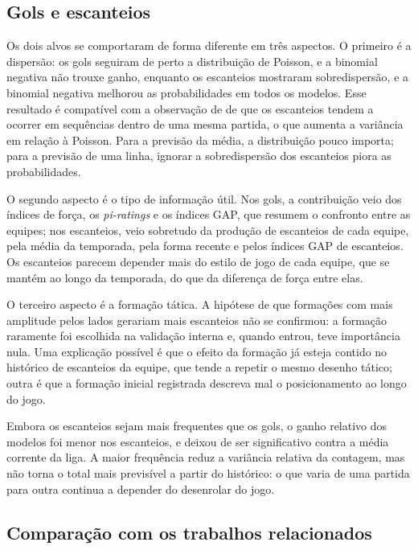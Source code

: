\subsection{Gols e escanteios}\label{subsec:DiscAlvos}

Os dois alvos se comportaram de forma diferente em três aspectos. O primeiro é a dispersão: os gols seguiram de perto a distribuição de Poisson, e a binomial negativa não trouxe ganho, enquanto os escanteios mostraram sobredispersão, e a binomial negativa melhorou as probabilidades em todos os modelos. Esse resultado é compatível com a observação de  de que os escanteios tendem a ocorrer em sequências dentro de uma mesma partida, o que aumenta a variância em relação à Poisson. Para a previsão da média, a distribuição pouco importa; para a previsão de uma linha, ignorar a sobredispersão dos escanteios piora as probabilidades.

O segundo aspecto é o tipo de informação útil. Nos gols, a contribuição veio dos índices de força, os \textit{pi-ratings} e os índices GAP, que resumem o confronto entre as equipes; nos escanteios, veio sobretudo da produção de escanteios de cada equipe, pela média da temporada, pela forma recente e pelos índices GAP de escanteios. Os escanteios parecem depender mais do estilo de jogo de cada equipe, que se mantém ao longo da temporada, do que da diferença de força entre elas.

O terceiro aspecto é a formação tática. A hipótese de que formações com mais amplitude pelos lados gerariam mais escanteios não se confirmou: a formação raramente foi escolhida na validação interna e, quando entrou, teve importância nula. Uma explicação possível é que o efeito da formação já esteja contido no histórico de escanteios da equipe, que tende a repetir o mesmo desenho tático; outra é que a formação inicial registrada descreva mal o posicionamento ao longo do jogo.

Embora os escanteios sejam mais frequentes que os gols, o ganho relativo dos modelos foi menor nos escanteios, e deixou de ser significativo contra a média corrente da liga. A maior frequência reduz a variância relativa da contagem, mas não torna o total mais previsível a partir do histórico: o que varia de uma partida para outra continua a depender do desenrolar do jogo.

\subsection{Comparação com os trabalhos relacionados}\label{subsec:DiscRelacionados}

